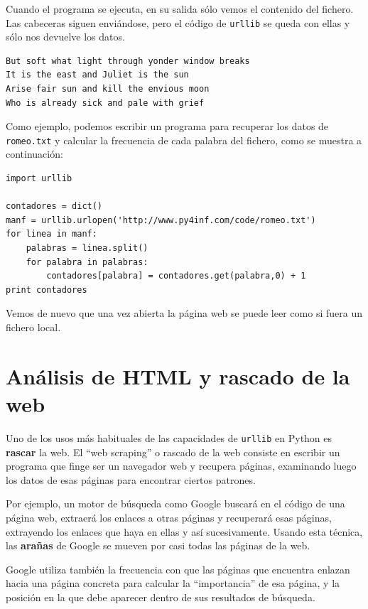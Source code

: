 Cuando el programa se ejecuta, en su salida
sólo vemos el contenido del fichero. Las cabeceras
siguen enviándose, pero el código de {\tt urllib}
se queda con ellas y sólo nos devuelve
los datos.

\beforeverb
\begin{verbatim}
But soft what light through yonder window breaks
It is the east and Juliet is the sun
Arise fair sun and kill the envious moon
Who is already sick and pale with grief
\end{verbatim}
\afterverb
%

Como ejemplo, podemos escribir un
programa para recuperar los datos de
{\tt romeo.txt} y calcular la frecuencia
de cada palabra del fichero, como se muestra a continuación:

\beforeverb
\begin{verbatim}
import urllib

contadores = dict()
manf = urllib.urlopen('http://www.py4inf.com/code/romeo.txt')
for linea in manf:
    palabras = linea.split()
    for palabra in palabras:
        contadores[palabra] = contadores.get(palabra,0) + 1   
print contadores
\end{verbatim}
\afterverb
%
Vemos de nuevo que una vez abierta la página web
se puede leer como si fuera un fichero local.

\section{Análisis de HTML y rascado de la web}

Uno de los usos más habituales de las capacidades de {\tt urllib} en Python
es {\bf rascar} la web. El ``web scraping'' o rascado de la web consiste en escribir un programa
que finge ser un navegador web y recupera páginas, examinando
luego los datos de esas páginas para encontrar ciertos patrones.

Por ejemplo, un motor de búsqueda como Google buscará en el código
de una página web, extraerá los enlaces a otras páginas y recuperará
esas páginas, extrayendo los enlaces que haya en ellas y así sucesivamente. Usando esta técnica,
las  {\bf arañas} de Google se mueven por casi todas las páginas de
la web.

Google utiliza también la frecuencia con que las páginas que encuentra enlazan
hacia una página concreta para calcular la ``importancia'' de
esa página, y la posición en la que debe aparecer dentro de sus resultados de búsqueda.

